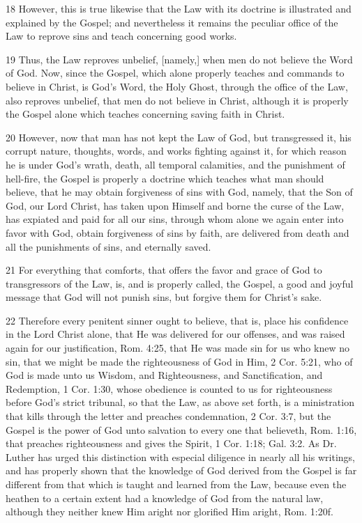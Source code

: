 18 However, this is true likewise that the Law with its doctrine is illustrated and explained by the Gospel; and nevertheless it remains the peculiar office of the Law to reprove sins and teach concerning good works.

19 Thus, the Law reproves unbelief, [namely,] when men do not believe the Word of God. Now, since the Gospel, which alone properly teaches and commands to believe in Christ, is God’s Word, the Holy Ghost, through the office of the Law, also reproves unbelief, that men do not believe in Christ, although it is properly the Gospel alone which teaches concerning saving faith in Christ.

20 However, now that man has not kept the Law of God, but transgressed it, his corrupt nature, thoughts, words, and works fighting against it, for which reason he is under God’s wrath, death, all temporal calamities, and the punishment of hell-fire, the Gospel is properly a doctrine which teaches what man should believe, that he may obtain forgiveness of sins with God, namely, that the Son of God, our Lord Christ, has taken upon Himself and borne the curse of the Law, has expiated and paid for all our sins, through whom alone we again enter into favor with God, obtain forgiveness of sins by faith, are delivered from death and all the punishments of sins, and eternally saved.

21 For everything that comforts, that offers the favor and grace of God to transgressors of the Law, is, and is properly called, the Gospel, a good and joyful message that God will not punish sins, but forgive them for Christ’s sake.

22 Therefore every penitent sinner ought to believe, that is, place his confidence in the Lord Christ alone, that He was delivered for our offenses, and was raised again for our justification, Rom. 4:25, that He was made sin for us who knew no sin, that we might be made the righteousness of God in Him, 2 Cor. 5:21, who of God is made unto us Wisdom, and Righteousness, and Sanctification, and Redemption, 1 Cor. 1:30, whose obedience is counted to us for righteousness before God’s strict tribunal, so that the Law, as above set forth, is a ministration that kills through the letter and preaches condemnation, 2 Cor. 3:7, but the Gospel is the power of God unto salvation to every one that believeth, Rom. 1:16, that preaches righteousness and gives the Spirit, 1 Cor. 1:18; Gal. 3:2. As Dr. Luther has urged this distinction with especial diligence in nearly all his writings, and has properly shown that the knowledge of God derived from the Gospel is far different from that which is taught and learned from the Law, because even the heathen to a certain extent had a knowledge of God from the natural law, although they neither knew Him aright nor glorified Him aright, Rom. 1:20f.

